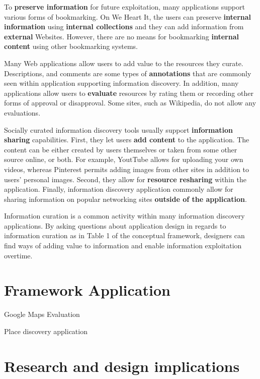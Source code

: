 \documentclass{casconpaper}
\begin{document}
{{To \textbf{preserve information} for future exploitation, many applications support various forms of bookmarking. On We Heart It, the users can preserve \textbf{internal  information} using \textbf{internal collections} and they can add information from \textbf{external} Websites. However, there are no means for bookmarking \textbf{internal content} using other bookmarking systems.  

Many Web applications allow users to add value to the resources they curate. Descriptions, and comments are some types of \textbf{annotations} that are commonly seen within application supporting information discovery. In addition, many applications allow users to \textbf{evaluate} resources by rating them or recording other forms of approval or disapproval. Some sites, such as Wikipedia, do not allow any evaluations.  

Socially curated information discovery tools usually support \textbf{information sharing} capabilities. First, they let users \textbf{add content} to the application. The content can be either created by users themselves or taken from some other source online, or both. For example, YoutTube allows for uploading your own videos, whereas Pinterest permits adding images from other sites in addition to users' personal images. Second, they allow for \textbf{resource resharing} within the application. Finally, information discovery application commonly allow for sharing information on popular networking sites \textbf{outside of the application}. 

Information curation is a common activity within many information discovery applications. By asking questions about application design in regards to information curation as in Table 1 of the conceptual framework, designers can find ways of adding value to information and enable information exploitation overtime.  
 
} %

{\section{Framework Application}
Google Maps Evaluation

Place discovery application


} %

{\section{Research and design implications}


}}
\end{document}
